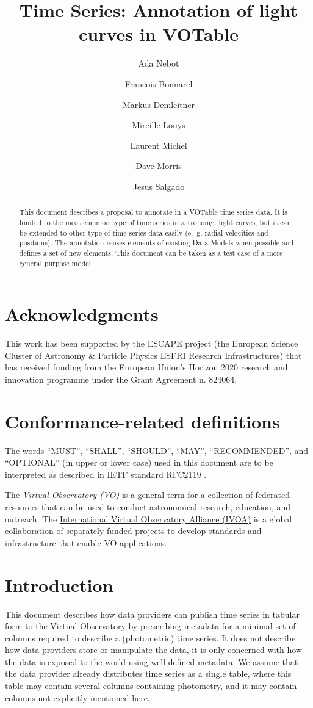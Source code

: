 \documentclass[11pt,a4paper]{ivoa} 
\title{Time Series: Annotation of light curves in VOTable}
\author[http://www.ivoa.net/twiki/bin/view/IVOA/AdaNebot]{Ada Nebot}
\author[http://www.ivoa.net/twiki/bin/view/IVOA/FrancoisBonnarel]{Francois
  Bonnarel}
\author[http://www.ivoa.net/twiki/bin/view/IVOA/MarkusDemleitner]{Markus
  Demleitner}
\author[http://www.ivoa.net/twiki/bin/view/IVOA/MireilleLouys]{Mireille
  Louys}
\author[http://www.ivoa.net/twiki/bin/view/IVOA/LaurentMichel]{Laurent
  Michel}
\author[http://www.ivoa.net/twiki/bin/view/IVOA/DaveMorris]{Dave
  Morris}
\author[http://www.ivoa.net/twiki/bin/view/IVOA/JesusSalgado]{Jesus
  Salgado} \editor{Ada Nebot}
\begin{document}
\begin{abstract}
  This document describes a proposal to annotate in a VOTable time
  series data. It is limited to the most common type of time series in
  astronomy: light curves, but it can be extended to other type of
  time series data easily (e.~g. radial velocities and positions). The
  annotation reuses elements of existing Data Models when possible and
  defines a set of new elements. This document can be taken as a test
  case of a more general purpose model.
\end{abstract}

\section*{Acknowledgments}
This work has been supported by the ESCAPE project (the European
Science Cluster of Astronomy \& Particle Physics ESFRI Research
Infrastructures) that has received funding from the European Union’s
Horizon 2020 research and innovation programme under the Grant
Agreement n. 824064.

\section*{Conformance-related definitions}

The words ``MUST'', ``SHALL'', ``SHOULD'', ``MAY'', ``RECOMMENDED'',
and ``OPTIONAL'' (in upper or lower case) used in this document are to
be interpreted as described in IETF standard RFC2119
\citet{std:RFC2119}.

The \emph{Virtual Observatory (VO)} is a general term for a collection
of federated resources that can be used to conduct astronomical
research, education, and outreach.  The
\href{http://www.ivoa.net}{International Virtual Observatory Alliance
  (IVOA)} is a global collaboration of separately funded projects to
develop standards and infrastructure that enable VO applications.


\section{Introduction}
This document describes how data providers can publish time series in
tabular form to the Virtual Observatory by prescribing metadata for a
minimal set of columns required to describe a (photometric) time
series.  It does not describe how data providers store or manipulate
the data, it is only concerned with how the data is exposed to the
world using well-defined metadata. We assume that the data provider
already distributes time series as a single table, where this table
may contain several columns containing photometry, and it may contain
columns not explicitly mentioned here.
\end{document}
